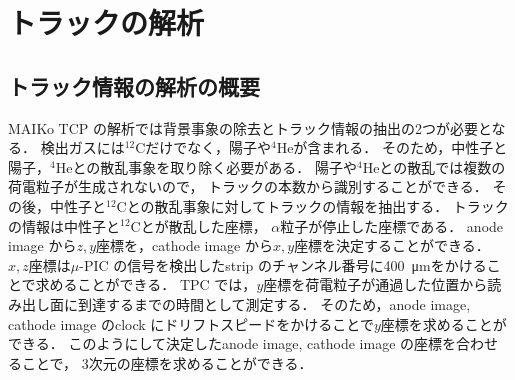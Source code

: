 \documentclass[../master]{subfiles}
\begin{document}
\chapter{トラックの解析}
\section{トラック情報の解析の概要}
MAIKo TCP の解析では背景事象の除去とトラック情報の抽出の2つが必要となる．
検出ガスには${}^{12}\mathrm{C}$だけでなく，陽子や${}^{4}\mathrm{He}$が含まれる．
そのため，中性子と陽子，${}^{4}\mathrm{He}$との散乱事象を取り除く必要がある．
陽子や${}^{4}\mathrm{He}$との散乱では複数の荷電粒子が生成されないので，
トラックの本数から識別することができる．
その後，中性子と${}^{12}\mathrm{C}$との散乱事象に対してトラックの情報を抽出する．
トラックの情報は中性子と${}^{12}\mathrm{C}$とが散乱した座標，
$\alpha$粒子が停止した座標である．
anode image から$z, y$座標を，cathode image から$x, y$座標を決定することができる．
$x, z$座標は$\mu$-PIC の信号を検出したstrip のチャンネル番号に\SI{400}{\micro\metre}をかけることで求めることができる．
TPC では，$y$座標を荷電粒子が通過した位置から読み出し面に到達するまでの時間として測定する．
そのため，anode image, cathode image のclock にドリフトスピードをかけることで$y$座標を求めることができる．
このようにして決定したanode image, cathode image の座標を合わせることで，
3次元の座標を求めることができる．
\end{document}
